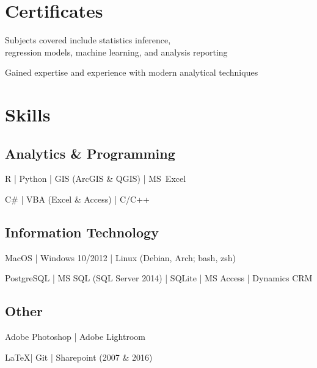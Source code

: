 \documentclass[]{deedy-resume-openfont}
\begin{document}
\begin{minipage}[t]{0.66\textwidth}

\section{Certificates}
\begin{tightemize}
\item Subjects covered include statistics inference,\\regression models, machine learning, and analysis reporting
\item Gained expertise and experience with modern analytical techniques
\end{tightemize}
\sectionsep


\section{Skills}
\subsection{Analytics \& Programming} 
\vspace{\topsep} %
\begin{tightemize}
\item R | Python | GIS (ArcGIS \& QGIS) | \mbox{MS Excel}
\item C\# | VBA (Excel \& Access) | C/C++
\end{tightemize}

\subsection{Information Technology}
\vspace{\topsep} %
\begin{tightemize}
\item MacOS | Windows 10/2012 | Linux (Debian, Arch; bash, zsh)
\item PostgreSQL | MS SQL (SQL Server 2014) | SQLite | MS Access | Dynamics CRM
\end{tightemize}

\subsection{Other}
\vspace{\topsep} %
\begin{tightemize}
\item Adobe Photoshop | Adobe Lightroom
\item \LaTeX | Git | Sharepoint (2007 \& 2016)
\end{tightemize}
\sectionsep


\end{minipage}
\end{document}
